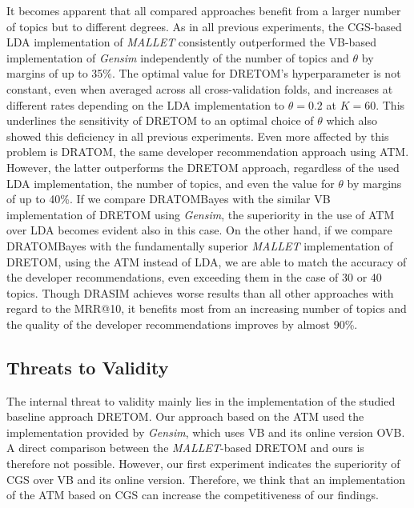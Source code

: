 \documentclass[a4paper,twoside]{article}
\begin{document}
It becomes apparent that all compared approaches benefit from a larger number of topics but to different degrees.
As in all previous experiments, the \ac{CGS}-based \ac{LDA} implementation of \textit{MALLET} consistently outperformed the \ac{VB}-based implementation of \textit{Gensim} independently of the number of topics and $\theta$ by margins of up to 35\%. 
The optimal value for \ac{DRETOM}'s hyperparameter is not constant,
even when averaged across all cross-validation folds, and increases at different rates depending on the \ac{LDA} implementation to $\theta = 0.2$ at $K=60$.
This underlines the sensitivity of \ac{DRETOM} to an optimal choice of $\theta$ which also showed this deficiency in all previous experiments.
Even more affected by this problem is \ac{DRATOM}, the same developer recommendation approach using \ac{ATM}.
However, the latter outperforms the \ac{DRETOM} approach,
regardless of the used \ac{LDA} implementation, the number of topics, and even the value for $\theta$ by margins of up to 40\%.
If we compare \ac{DRATOMBayes} with the similar \ac{VB} implementation of \ac{DRETOM} using \textit{Gensim},
the superiority in the use of \ac{ATM} over \ac{LDA} becomes evident also in this case.
On the other hand, if we compare \ac{DRATOMBayes} with the fundamentally superior \textit{MALLET} implementation of \ac{DRETOM}, using the \ac{ATM} instead of \ac{LDA}, we are able to match the accuracy of the developer recommendations, even exceeding them in the case of 30 or 40 topics.
Though \ac{DRASIM} achieves worse results than all other approaches with regard to the \ac{MRR}@10, it benefits most from an increasing number of topics and the quality of the developer recommendations improves by almost 90\%.

\subsection{Threats to Validity}
\label{section: validity}

The internal threat to validity mainly lies in the implementation of the studied baseline approach \ac{DRETOM}.
Our approach based on the \ac{ATM} used the implementation provided by \textit{Gensim}, which uses \ac{VB} and its online version \ac{OVB}.
A direct comparison between the \textit{MALLET}-based \ac{DRETOM} and ours is therefore not possible.
However, our first experiment indicates the superiority of \ac{CGS} over \ac{VB} and its online version.
Therefore, we think that an implementation of the \ac{ATM} based on \ac{CGS} can increase the competitiveness of our findings. 
\end{document}
